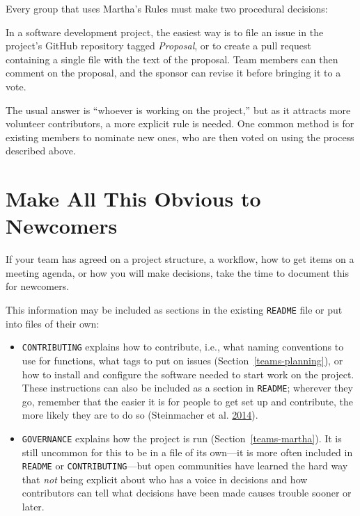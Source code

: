 \documentclass[
]{krantz}
\providecommand{\tightlist}{%
  \setlength{\itemsep}{0pt}\setlength{\parskip}{0pt}}
\begin{document}
Every group that uses Martha's Rules must make two procedural decisions:

\begin{description}
\tightlist
\item[How are proposals put forward?]
In a software development project,
the easiest way is to file an issue in the project's GitHub repository
tagged \emph{Proposal},
or to create a pull request containing a single file
with the text of the proposal.
Team members can then comment on the proposal,
and the sponsor can revise it
before bringing it to a vote.
\item[Who gets to vote?]
The usual answer is ``whoever is working on the project,''
but as it attracts more volunteer contributors,
a more explicit rule is needed.
One common method is for existing members to nominate new ones,
who are then voted on using the process described above.
\end{description}

\hypertarget{teams-documentation}{%
\section{Make All This Obvious to Newcomers}\label{teams-documentation}}

If your team has agreed on a project structure,
a workflow,
how to get items on a meeting agenda,
or how you will make decisions,
take the time to document this for newcomers.

This information may be included as sections in the existing \texttt{README} file
or put into files of their own:

\begin{itemize}
\item
  \texttt{CONTRIBUTING}
  explains how to contribute,
  i.e.,
  what naming conventions to use for functions,
  what tags to put on issues (Section~\ref{teams-planning}),
  or how to install and configure the software needed to start work on the project.
  These instructions can also be included as a section in \texttt{README};
  wherever they go,
  remember that the easier it is for people to get set up and contribute,
  the more likely they are to do so (Steinmacher et al. \protect\hyperlink{ref-Stei2014}{2014}).
\item
  \texttt{GOVERNANCE}
  explains how the project is run (Section~\ref{teams-martha}).
  It is still uncommon for this to be in a file of its own---it is more often included
  in \texttt{README} or \texttt{CONTRIBUTING}---but open communities have learned the hard way
  that \emph{not} being explicit about who has a voice in decisions
  and how contributors can tell what decisions have been made
  causes trouble sooner or later.
\end{itemize}
\end{document}
